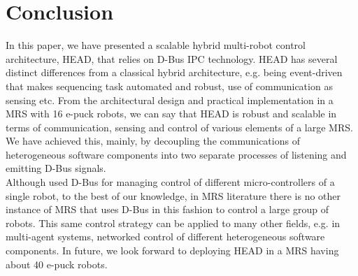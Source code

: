 \documentclass{ifacconf}
\begin{document}
\section{Conclusion}
\label{sec:conc}
In this paper, we have presented a scalable hybrid multi-robot control architecture, HEAD, that relies on D-Bus IPC technology. HEAD has several distinct differences from a classical hybrid architecture, e.g. being event-driven that makes sequencing task automated and robust, use of communication as sensing etc. From the architectural design and practical implementation in a MRS with 16 e-puck robots, we can say that HEAD is robust and scalable in terms of communication, sensing and control of various elements of a large MRS. We have achieved this, mainly, by decoupling the communications of heterogeneous software components into two separate processes of listening and emitting D-Bus signals.\\
Although \cite{Magnenat+2009} used D-Bus for managing control of different micro-controllers of a single robot, to the best of our knowledge, in MRS literature there is no other instance of MRS that uses D-Bus in this fashion to control a large group of robots. This same control strategy can be applied to many other fields, e.g. in multi-agent systems, networked control of different heterogeneous software components. In future, we look forward to deploying HEAD in a MRS having about 40 e-puck robots.
\end{document}
